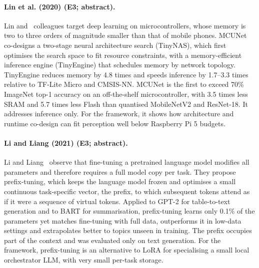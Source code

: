 \documentclass[10pt,a4paper]{article}
\begin{document}
\paragraph{Lin et al. (2020) (E3; abstract).} Lin and~\cite{Lin2020} colleagues target deep learning on microcontrollers, whose memory is two to three orders of magnitude smaller than that of mobile phones. MCUNet co-designs a two-stage neural architecture search (TinyNAS), which first optimises the search space to fit resource constraints, with a memory-efficient inference engine (TinyEngine) that schedules memory by network topology. TinyEngine reduces memory by 4.8 times and speeds inference by 1.7--3.3 times relative to TF-Lite Micro and CMSIS-NN. MCUNet is the first to exceed 70\% ImageNet top-1 accuracy on an off-the-shelf microcontroller, with 3.5 times less SRAM and 5.7 times less Flash than quantised MobileNetV2 and ResNet-18. It addresses inference only. For the framework, it shows how architecture and runtime co-design can fit perception well below Raspberry Pi 5 budgets.

\paragraph{Li and Liang (2021) (E3; abstract).} Li and Liang~\cite{Li2021} observe that fine-tuning a pretrained language model modifies all parameters and therefore requires a full model copy per task. They propose prefix-tuning, which keeps the language model frozen and optimises a small continuous task-specific vector, the prefix, to which subsequent tokens attend as if it were a sequence of virtual tokens. Applied to GPT-2 for table-to-text generation and to BART for summarisation, prefix-tuning learns only 0.1\% of the parameters yet matches fine-tuning with full data, outperforms it in low-data settings and extrapolates better to topics unseen in training. The prefix occupies part of the context and was evaluated only on text generation. For the framework, prefix-tuning is an alternative to LoRA for specialising a small local orchestrator LLM, with very small per-task storage.
\end{document}
